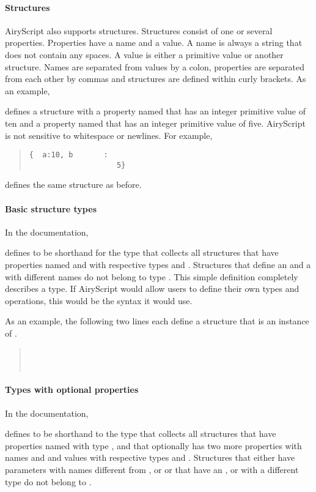 \paragraph{Structures}
AiryScript also supports structures. Structures consist of one or several
properties. Properties have a name and a value. A name is always a string that
does not contain any spaces. A value is either a primitive value or another
structure. Names are separated from values by a colon, properties are separated
from each other by commas and structures are defined within curly brackets. As
an example,
\begin{quote}
\end{quote}
defines a structure with a property named  that has an integer primitive
value of ten and a property named  that has an integer primitive value of
five. AiryScript is not sensitive to whitespace or newlines. For example,
\begin{quote}
  \begin{verbatim}
{  a:10, b       :
                    5}
  \end{verbatim}
\end{quote}
defines the same structure as before.


\paragraph{Basic structure types}
In the documentation,
\begin{quote}
\end{quote}
defines  to be shorthand for the type that collects all structures that
have properties named  and  with respective types  and
. Structures that define an  and a  with
different names do not belong to type . This simple definition completely
describes a type. If AiryScript would allow users to define their own types and
operations, this would be the syntax it would use.

As an example, the following two lines each define a structure that is an
instance of .
\begin{quote}
  \\
  \\
\end{quote}


\paragraph{Types with optional properties}
In the documentation,
\begin{quote}
\end{quote}
defines  to be shorthand to the type that collects all structures that
have properties named  with type , and that optionally has two
more properties with names  and  and values with respective types
 and . Structures that either have parameters
with names different from ,  or  or that have an ,
 or  with a different type do not belong to .

